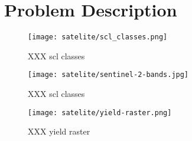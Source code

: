 \chapter{Problem Description}


\begin{figure}[h]
    \label{table:satelite/scl_classes}
    \center
    \texttt{[image: satelite/scl\_classes.png]}
    \caption{XXX scl classes}
\end{figure}

\begin{figure}[h]
    \label{fig:satelite/sentinel-2-bands}
    \center
    \texttt{[image: satelite/sentinel-2-bands.jpg]}
    \caption{XXX scl classes}
\end{figure}

\begin{figure}[h]
    \label{fig:satelite/yield-raster}
    \center
    \texttt{[image: satelite/yield-raster.png]}
    \caption{XXX yield raster}
\end{figure}

